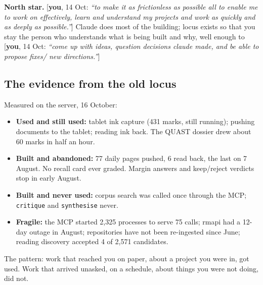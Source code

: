 \documentclass[10pt]{extarticle}
\newcommand{\you}[2]{{\small[\textbf{you}, #1: \textit{``#2''}]}}
\newcommand{\Sub}[1]{\subsection*{#1}}
\begin{document}
\textbf{North star.} \you{14 Oct}{to make it as frictionless as possible all to enable me to work on effectively, learn and understand my projects and work as quickly and as deeply as possible.} Claude does most of the building; locus exists so that you stay the person who understands what is being built and why, well enough to \you{14 Oct}{come up with ideas, question decisions claude made, and be able to propose fixes/ new directions.}

\Sub{The evidence from the old locus}
Measured on the server, 16 October:
\begin{itemize}
\item \textbf{Used and still used:} tablet ink capture (431 marks, still running); pushing documents to the tablet; reading ink back. The QUAST dossier drew about 60 marks in half an hour.
\item \textbf{Built and abandoned:} 77 daily pages pushed, 6 read back, the last on 7 August. No recall card ever graded. Margin answers and keep/reject verdicts stop in early August.
\item \textbf{Built and never used:} corpus search was called once through the MCP; \texttt{critique} and \texttt{synthesise} never.
\item \textbf{Fragile:} the MCP started 2,325 processes to serve 75 calls; rmapi had a 12-day outage in August; repositories have not been re-ingested since June; reading discovery accepted 4 of 2,571 candidates.
\end{itemize}
The pattern: work that reached you on paper, about a project you were in, got used. Work that arrived unasked, on a schedule, about things you were not doing, did not.
\end{document}
